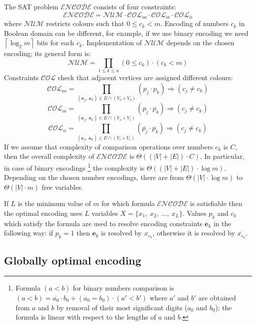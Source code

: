 The SAT problem $\mathcal{ENCODE}$ consists of four constraints:
\[
\mathcal{ENCODE}=\mathcal{NUM}\cdot\mathcal{COL}_{oo}\cdot\mathcal{COL}_{oi}\cdot\mathcal{COL}_{ii}
\]
where $\mathcal{NUM}$ restricts colours such that $0\le c_{k}<m$.
Encoding of numbers $c_{k}$ in Boolean domain can be different, for
example, if we use binary encoding we need $\left\lceil \log_{2}m\right\rceil $
bits for each $c_{k}$. Implementation of $\mathcal{NUM}$ depends
on the chosen encoding; its general form is:
\[
\mathcal{NUM}=\prod_{1\le k\le n}(0\le c_{k})\cdot(c_{k}<m)
\]
Constraints $\mathcal{COL}$ check that adjacent vertices are assigned
different colours:
\[
\mathcal{COL}_{oo}=\prod_{(\mathbf{e}_{j},\ \mathbf{e}_{k})\in E\cap(V_{o}\times V_{o})}(p_{j}\cdot p_{k})\Rightarrow(c_{j}\neq c_{k})
\]
\[
\mathcal{COL}_{oi}=\prod_{(\mathbf{e}_{j},\ \overline{\mathbf{e}}_{k})\in E\cap(V_{o}\times V_{i})}(p_{j}\cdot\overline{p_{k}})\Rightarrow(c_{j}\neq c_{k})
\]
\[
\mathcal{COL}_{ii}=\prod_{(\overline{\mathbf{e}}_{j},\ \overline{\mathbf{e}}_{k})\in E\cap(V_{i}\times V_{i})}(\overline{p_{j}}\cdot\overline{p_{k}})\Rightarrow(c_{j}\neq c_{k})
\]
If we assume that complexity of comparison operations over numbers
$c_{k}$ is $C$, then the overall complexity of $\mathcal{ENCODE}$
is $\Theta((|V|+|E|)\cdot C)$. In particular, in case of binary encodings%
\footnote{Formula $(a<b)$ for binary numbers comparison is $(a<b)=\overline{a_{0}}\cdot b_{0}+(a_{0}=b_{0})\cdot(a'<b')$
where $a'$ and $b'$ are obtained from $a$ and $b$ by removal of
their most significant digits ($a_{0}$ and $b_{0}$); the formula
is linear with respect to the lengths of $a$ and $b$.%
} the complexity is $\Theta((|V|+|E|)\cdot\log m)$. Depending on the
chosen number encodings, there are from $\Theta(|V|\cdot\log m)$
to $\Theta(|V|\cdot m)$ free variables.

If $L$ is the minimum value of $m$ for which formula $\mathcal{ENCODE}$
is satisfiable then the optimal encoding uses $L$ variables $X=\{x_{1},\ x_{2},\ ...,\ x_{L}\}$.
Values $p_{k}$ and $c_{k}$ which satisfy the formula are used to
resolve encoding constraints $\mathbf{e}_{k}$ in the following way:
if $p_{k}=1$ then $\mathbf{e}_{k}$ is resolved by $x_{c_{k}}$,
otherwise it is resolved by $\overline{x_{c_{k}}}$.


\subsection{Globally optimal encoding}

